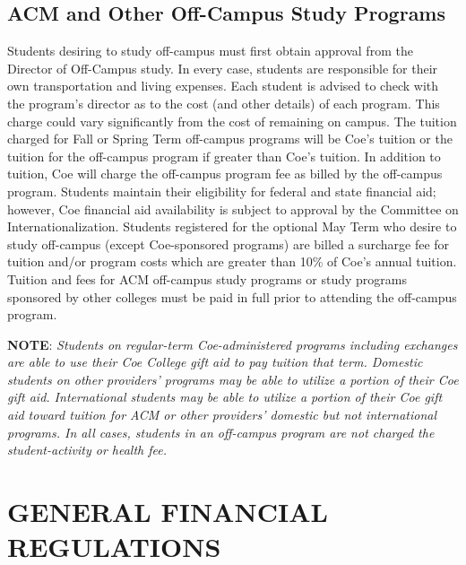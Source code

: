 \documentclass[
  letterpaper,
]{scrbook}
\begin{document}
\subsection{ACM and Other Off-Campus Study
Programs}\label{acm-and-other-off-campus-study-programs}

Students desiring to study off-campus must first obtain approval from
the Director of Off-Campus study. In every case, students are
responsible for their own transportation and living expenses. Each
student is advised to check with the program's director as to the cost
(and other details) of each program. This charge could vary
significantly from the cost of remaining on campus. The tuition charged
for Fall or Spring Term off-campus programs will be Coe's tuition or the
tuition for the off-campus program if greater than Coe's tuition. In
addition to tuition, Coe will charge the off-campus program fee as
billed by the off-campus program. Students maintain their eligibility
for federal and state financial aid; however, Coe financial aid
availability is subject to approval by the Committee on
Internationalization. Students registered for the optional May Term who
desire to study off-campus (except Coe-sponsored programs) are billed a
surcharge fee for tuition and/or program costs which are greater than
10\% of Coe's annual tuition. Tuition and fees for ACM off-campus study
programs or study programs sponsored by other colleges must be paid in
full prior to attending the off-campus program.

\textbf{NOTE}: \emph{Students on regular-term Coe-administered programs
including exchanges are able to use their Coe College gift aid to pay
tuition that term. Domestic students on other providers' programs may be
able to utilize a portion of their Coe gift aid. International students
may be able to utilize a portion of their Coe gift aid toward tuition
for ACM or other providers' domestic but not international programs. In
all cases, students in an off-campus program are not charged the
student-activity or health fee.}

\section{GENERAL FINANCIAL
REGULATIONS}\label{general-financial-regulations}
\end{document}
